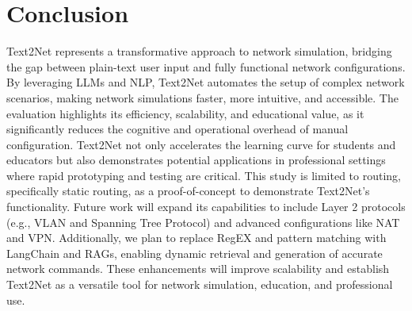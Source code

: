 \vspace{-2mm}\section{Conclusion} 
Text2Net represents a transformative approach to network simulation, bridging the gap between plain-text user input and fully functional network configurations. By leveraging LLMs and NLP, Text2Net automates the setup of complex network scenarios, making network simulations faster, more intuitive, and accessible. The evaluation highlights its efficiency, scalability, and educational value, as it significantly reduces the cognitive and operational overhead of manual configuration. Text2Net not only accelerates the learning curve for students and educators but also demonstrates potential applications in professional settings where rapid prototyping and testing are critical. This study is limited to routing, specifically static routing, as a proof-of-concept to demonstrate Text2Net's functionality. Future work will expand its capabilities to include Layer 2 protocols (e.g., VLAN and Spanning Tree Protocol) and advanced configurations like NAT and VPN. Additionally, we plan to replace RegEX and pattern matching with LangChain and RAGs, enabling dynamic retrieval and generation of accurate network commands. These enhancements will improve scalability and establish Text2Net as a versatile tool for network simulation, education, and professional use.



